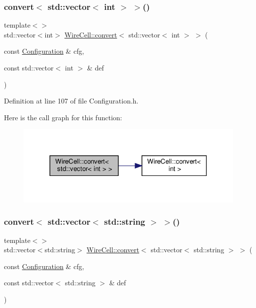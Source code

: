\subsubsection{\texorpdfstring{convert$<$ std\+::vector$<$ int $>$ $>$()}{convert< std::vector< int > >()}}
{\footnotesize\ttfamily template$<$$>$ \\
std\+::vector$<$int$>$ \hyperlink{namespace_wire_cell_a5f6648d6ae801b20a17b8a35fd3306e5}{Wire\+Cell\+::convert}$<$ std\+::vector$<$ int $>$ $>$ (\begin{DoxyParamCaption}\item[{const \hyperlink{namespace_wire_cell_a9f705541fc1d46c608b3d32c182333ee}{Configuration} \&}]{cfg,  }\item[{const std\+::vector$<$ int $>$ \&}]{def }\end{DoxyParamCaption})\hspace{0.3cm}{\ttfamily [inline]}}



Definition at line 107 of file Configuration.\+h.

Here is the call graph for this function\+:
\nopagebreak
\begin{figure}[H]
\begin{center}
\leavevmode
\includegraphics[width=318pt]{namespace_wire_cell_a26f264ab9870372316e8c325576e097b_cgraph}
\end{center}
\end{figure}
\mbox{\label{namespace_wire_cell_a0d9a7424eee11d76d9a8ead48e8b3642}} 
\subsubsection{\texorpdfstring{convert$<$ std\+::vector$<$ std\+::string $>$ $>$()}{convert< std::vector< std::string > >()}}
{\footnotesize\ttfamily template$<$$>$ \\
std\+::vector$<$std\+::string$>$ \hyperlink{namespace_wire_cell_a5f6648d6ae801b20a17b8a35fd3306e5}{Wire\+Cell\+::convert}$<$ std\+::vector$<$ std\+::string $>$ $>$ (\begin{DoxyParamCaption}\item[{const \hyperlink{namespace_wire_cell_a9f705541fc1d46c608b3d32c182333ee}{Configuration} \&}]{cfg,  }\item[{const std\+::vector$<$ std\+::string $>$ \&}]{def }\end{DoxyParamCaption})\hspace{0.3cm}{\ttfamily [inline]}}



